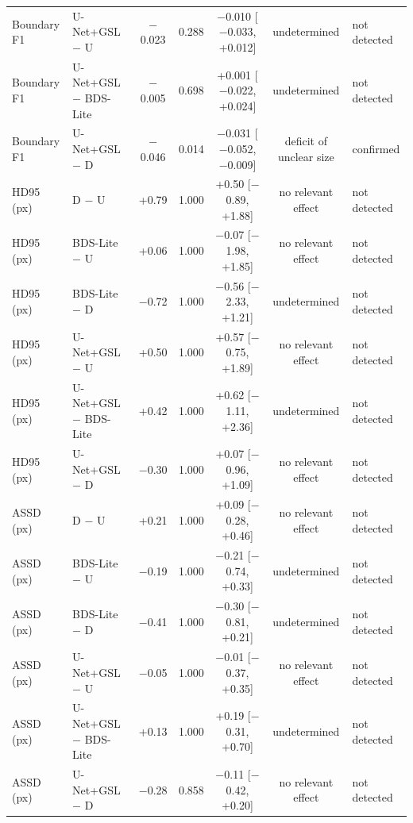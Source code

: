 \begin{tabular}{llccccl}
Boundary F1 & U-Net+GSL $-$ U & $-$0.023 & 0.288 & $-$0.010 [$-$0.033, +0.012] & undetermined & not detected \\
Boundary F1 & U-Net+GSL $-$ BDS-Lite & $-$0.005 & 0.698 & +0.001 [$-$0.022, +0.024] & undetermined & not detected \\
Boundary F1 & U-Net+GSL $-$ D & $-$0.046 & 0.014 & $-$0.031 [$-$0.052, $-$0.009] & deficit of unclear size & confirmed \\
\midrule
HD95 (px) & D $-$ U & +0.79 & 1.000 & +0.50 [$-$0.89, +1.88] & no relevant effect & not detected \\
HD95 (px) & BDS-Lite $-$ U & +0.06 & 1.000 & $-$0.07 [$-$1.98, +1.85] & no relevant effect & not detected \\
HD95 (px) & BDS-Lite $-$ D & $-$0.72 & 1.000 & $-$0.56 [$-$2.33, +1.21] & undetermined & not detected \\
HD95 (px) & U-Net+GSL $-$ U & +0.50 & 1.000 & +0.57 [$-$0.75, +1.89] & no relevant effect & not detected \\
HD95 (px) & U-Net+GSL $-$ BDS-Lite & +0.42 & 1.000 & +0.62 [$-$1.11, +2.36] & undetermined & not detected \\
HD95 (px) & U-Net+GSL $-$ D & $-$0.30 & 1.000 & +0.07 [$-$0.96, +1.09] & no relevant effect & not detected \\
\midrule
ASSD (px) & D $-$ U & +0.21 & 1.000 & +0.09 [$-$0.28, +0.46] & no relevant effect & not detected \\
ASSD (px) & BDS-Lite $-$ U & $-$0.19 & 1.000 & $-$0.21 [$-$0.74, +0.33] & undetermined & not detected \\
ASSD (px) & BDS-Lite $-$ D & $-$0.41 & 1.000 & $-$0.30 [$-$0.81, +0.21] & undetermined & not detected \\
ASSD (px) & U-Net+GSL $-$ U & $-$0.05 & 1.000 & $-$0.01 [$-$0.37, +0.35] & no relevant effect & not detected \\
ASSD (px) & U-Net+GSL $-$ BDS-Lite & +0.13 & 1.000 & +0.19 [$-$0.31, +0.70] & undetermined & not detected \\
ASSD (px) & U-Net+GSL $-$ D & $-$0.28 & 0.858 & $-$0.11 [$-$0.42, +0.20] & no relevant effect & not detected \\
\bottomrule
\end{tabular}
